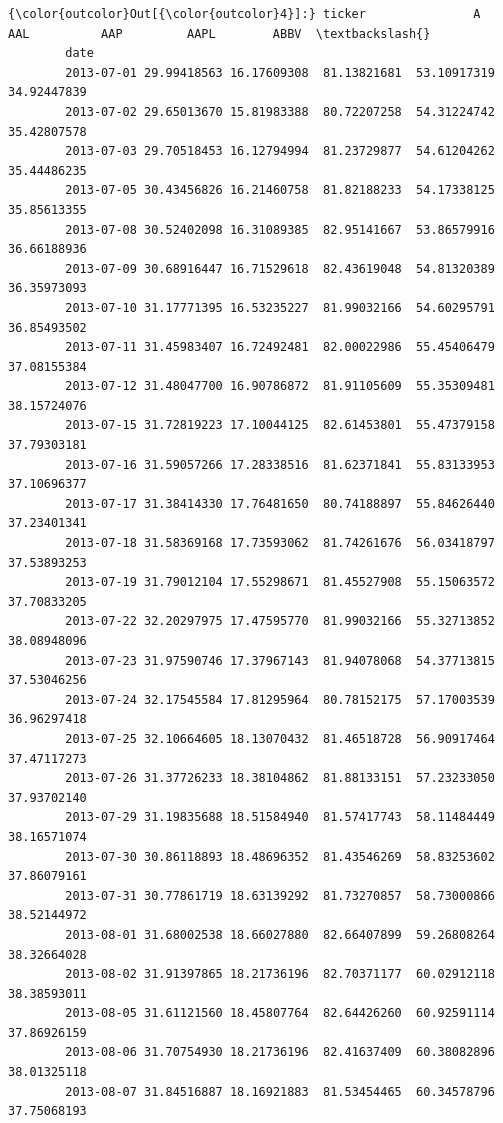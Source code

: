 \documentclass[11pt]{article}
\begin{document}
\begin{Verbatim}[commandchars=\\\{\}]
{\color{outcolor}Out[{\color{outcolor}4}]:} ticker               A         AAL          AAP         AAPL        ABBV  \textbackslash{}
        date                                                                       
        2013-07-01 29.99418563 16.17609308  81.13821681  53.10917319 34.92447839   
        2013-07-02 29.65013670 15.81983388  80.72207258  54.31224742 35.42807578   
        2013-07-03 29.70518453 16.12794994  81.23729877  54.61204262 35.44486235   
        2013-07-05 30.43456826 16.21460758  81.82188233  54.17338125 35.85613355   
        2013-07-08 30.52402098 16.31089385  82.95141667  53.86579916 36.66188936   
        2013-07-09 30.68916447 16.71529618  82.43619048  54.81320389 36.35973093   
        2013-07-10 31.17771395 16.53235227  81.99032166  54.60295791 36.85493502   
        2013-07-11 31.45983407 16.72492481  82.00022986  55.45406479 37.08155384   
        2013-07-12 31.48047700 16.90786872  81.91105609  55.35309481 38.15724076   
        2013-07-15 31.72819223 17.10044125  82.61453801  55.47379158 37.79303181   
        2013-07-16 31.59057266 17.28338516  81.62371841  55.83133953 37.10696377   
        2013-07-17 31.38414330 17.76481650  80.74188897  55.84626440 37.23401341   
        2013-07-18 31.58369168 17.73593062  81.74261676  56.03418797 37.53893253   
        2013-07-19 31.79012104 17.55298671  81.45527908  55.15063572 37.70833205   
        2013-07-22 32.20297975 17.47595770  81.99032166  55.32713852 38.08948096   
        2013-07-23 31.97590746 17.37967143  81.94078068  54.37713815 37.53046256   
        2013-07-24 32.17545584 17.81295964  80.78152175  57.17003539 36.96297418   
        2013-07-25 32.10664605 18.13070432  81.46518728  56.90917464 37.47117273   
        2013-07-26 31.37726233 18.38104862  81.88133151  57.23233050 37.93702140   
        2013-07-29 31.19835688 18.51584940  81.57417743  58.11484449 38.16571074   
        2013-07-30 30.86118893 18.48696352  81.43546269  58.83253602 37.86079161   
        2013-07-31 30.77861719 18.63139292  81.73270857  58.73000866 38.52144972   
        2013-08-01 31.68002538 18.66027880  82.66407899  59.26808264 38.32664028   
        2013-08-02 31.91397865 18.21736196  82.70371177  60.02912118 38.38593011   
        2013-08-05 31.61121560 18.45807764  82.64426260  60.92591114 37.86926159   
        2013-08-06 31.70754930 18.21736196  82.41637409  60.38082896 38.01325118   
        2013-08-07 31.84516887 18.16921883  81.53454465  60.34578796 37.75068193   

\end{Verbatim}
\end{document}
